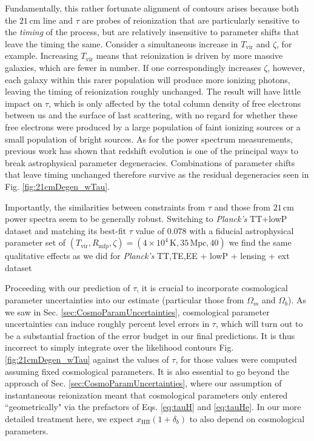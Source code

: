 \documentclass[twocolumn,aps,prd,nofootinbib,showpacs]{revtex4-1}
\begin{document}
Fundamentally, this rather fortunate alignment of contours arises because both the $21\,\textrm{cm}$ line and $\tau$ are probes of reionization that are particularly sensitive to the \emph{timing} of the process, but are relatively insensitive to parameter shifts that leave the timing the same. Consider a simultaneous increase in $T_\textrm{vir}$ and $\zeta$, for example. Increasing $T_\textrm{vir}$ means that reionization is driven by more massive galaxies, which are fewer in number. If one correspondingly increases $\zeta$, however, each galaxy within this rarer population will produce more ionizing photons, leaving the timing of reionization roughly unchanged. The result will have little impact on $\tau$, which is only affected by the total column density of free electrons between us and the surface of last scattering, with no regard for whether these free electrons were produced by a large population of faint ionizing sources or a small population of bright sources. As for the power spectrum measurements, previous work \cite{pober_et_al2014} has shown that redshift evolution is one of the principal ways to break astrophysical parameter degeneracies. Combinations of parameter shifts that leave timing unchanged therefore survive as the residual degeneracies seen in Fig. \ref{fig:21cmDegen_wTau}.

Importantly, the similarities between constraints from $\tau$ and those from $21\,\textrm{cm}$  power spectra seem to be generally robust. Switching to \emph{Planck's} TT+lowP dataset and matching its best-fit $\tau$ value of $0.078$ with a fiducial astrophysical parameter set of $(T_\textrm{vir}, R_\textrm{mfp}, \zeta) = (4 \times 10^4\,\textrm{K}, 35\,\textrm{Mpc}, 40)$ we find the same qualitative effects as we did for \emph{Planck's} TT,TE,EE + lowP + lensing + ext dataset

Proceeding with our prediction of $\tau$, it is crucial to incorporate cosmological parameter uncertainties into our estimate (particular those from $\Omega_m$ and $\Omega_b$). As we saw in Sec. \ref{sec:CosmoParamUncertainties}, cosmological parameter uncertainties can induce roughly percent level errors in $\tau$, which will turn out to be a substantial fraction of the error budget in our final predictions. It is thus incorrect to simply integrate over the likelihood contours Fig. \ref{fig:21cmDegen_wTau} against the values of $\tau$, for those values were computed assuming fixed cosmological parameters. It is also essential to go beyond the approach of Sec. \ref{sec:CosmoParamUncertainties}, where our assumption of instantaneous reionization meant that cosmological parameters only entered ``geometrically" via the prefactors of Eqs. \eqref{eq:tauH} and \eqref{eq:tauHe}. In our more detailed treatment here, we expect $\overline{x_\textrm{HII} (1+\delta_b)}$ to also depend on cosmological parameters.
\end{document}
